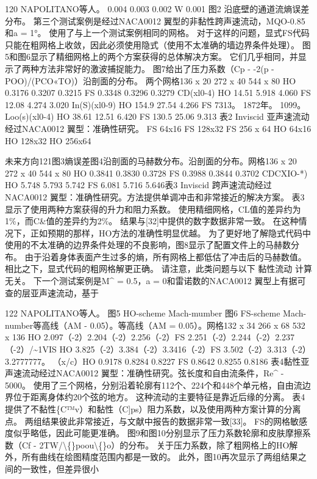 \documentclass[UTF8,11pt,a4paper,openany,fontset=fandol]{ctexbook}
\begin{document}
120 NAPOLITANO等人。 0.004 0.003 0.002 W 0.001 图2 沿底壁的通道流熵误差分布。 第三个测试案例是经过NACA0012 翼型的非黏性跨声速流动，MQO-0.85和a = 1°。 使用了与上一个测试案例相同的网格。 对于这样的问题，显式FS代码只能在粗网格上收敛，因此必须使用隐式（使用不太准确的墙边界条件处理）。 图5和图6显示了精细网格上的两个方案获得的总体解决方案。 它们几乎相同，并显示了两种方法非常好的激波捕捉能力。 图7给出了压力系数（Cp - -2(p - POO)/(PCO«TO)）沿剖面的分布。 两个网格136 x 20 272 x 40 544 x 80 HO 0.3176 0.3207 0.3215 FS 0.3348 0.3296 0.3279 CD(xl0-4) HO 14.51 5.918 4.060 FS 12.08 4.274 3.020 In(S)(xl0-9) HO 154.9 27.54 4.266 FS 7313。 1872年。 1099。 Loo(s)(xl0-4) HO 38.61 12.51 6.420 FS 130.5 25.06 9.313 表2 Inviscid 亚声速流动经过NACA0012 翼型：准确性研究。 FS 64x16 FS 128x32 FS 256 x 64 HO 64x16 HO 128x32 HO 256x64

未来方向121图3熵误差图4沿剖面的马赫数分布。沿剖面的分布。网格136 x 20 272 x 40 544 x 80 HO 0.3841 0.3830 0.3728 FS 0.3988 0.3844 0.3702 CDCXIO-*) HO 5.748 5.793 5.742 FS 6.081 5.716 5.646表3 Inviscid 跨声速流动经过NACA0012 翼型：准确性研究。方法提供单调冲击和非常接近的解决方案。 表3显示了使用两种方案获得的升力和阻力系数。 使用精细网格，CL值的差异约为1\%，而C\&值的差异约为2\%。 结果与[32]中提供的数字数据非常一致。 在这种情况下，正如预期的那样，HO方法的准确性明显优越。 为了更好地了解隐式代码中使用的不太准确的边界条件处理的不良影响，图8显示了配置文件上的马赫数分布。 由于沿着身体表面产生过多的熵，所有网格上都低估了冲击后的马赫数值。 相比之下，显式代码的粗网格解更正确。 请注意，此类问题与以下 黏性流动 计算无关。 下一个测试案例是M\textasciicircum{} = 0.5，a = 0和雷诺数的NACA0012 翼型上有据可查的层亚声速流动，基于

122 NAPOLITANO等人。 图5 HO-scheme Mach-mumber 图6 FS-scheme Mach-number等高线（AM - 0.05）。等高线（AM = 0.05）。网格132 x 34 266 x 68 532 x 136 HO 2.097（-2）2.204（-2）2.256（-2）FS 2.251（-2）2.244（-2）2.237（-2）/\textasciitilde{}1VIS HO 3.825（-2）3.384（-2）3.3416（-2）FS 3.502（-2）3.313（-2）3.2777777。 （x/c）HO 0.9178 0.8284 0.8227 FS 0.8642 0.8255 0.8186 表4黏性亚声速流动经过NACA0012 翼型：准确性研究。弦长度和自由流条件，Re\textasciicircum{} - 5000。 使用了三个网格，分别沿着轮廓有112个、224个和448个单元格，自由流边界位于距离身体约20个弦的地方。 这种流动的主要特征是靠近后缘的分离。 表4提供了不黏性\{C™v）和黏性（C]ps）阻力系数，以及使用两种方案计算的分离点。 两组结果彼此非常接近，与文献中报告的数据非常一致[33]。 FS的网格敏感度似乎略低，因此可能更准确。 图9和图10分别显示了压力系数轮廓和皮肤摩擦系数（Cf - 2TW/\textbackslash\{\}poou\textbackslash\{\}o）的分布。 关于压力系数，除了粗网格上的HO解外，所有曲线在绘图精度范围内都是一致的。 此外，图10再次显示了两组结果之间的一致性，但差异很小
\end{document}

